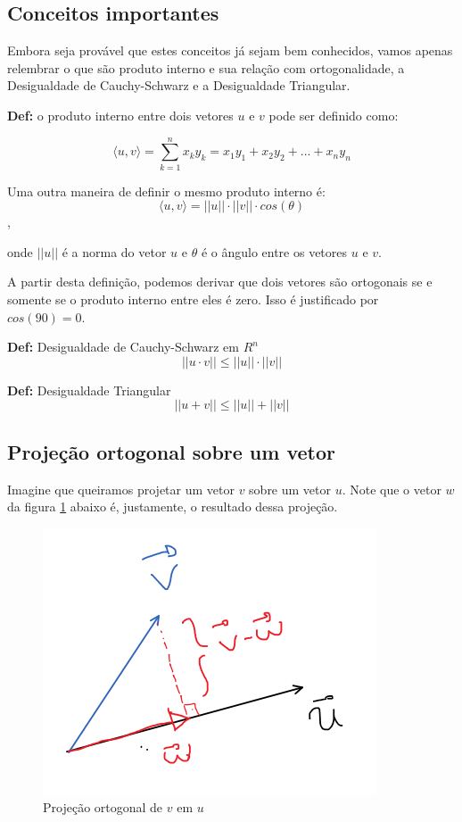 \documentclass[12pt]{article}
\begin{document}
	\subsection{Conceitos importantes}
	
	Embora seja provável que estes conceitos já sejam bem conhecidos, vamos apenas relembrar o que são produto interno e sua relação com ortogonalidade, a Desigualdade de  Cauchy-Schwarz e a Desigualdade Triangular.
	
	\textbf{Def:} o produto interno entre dois vetores $u$ e $v$ pode ser definido como:
	
	\begin{equation*}
		\langle u,v \rangle=\sum_{k=1}^{n}x_k y_k=x_1 y_1+x_2 y_2+...+x_n y_n
	\end{equation*}
	
	Uma outra maneira de definir o mesmo produto interno é:
	\begin{equation*}
		\langle u,v \rangle=||u||\cdot||v||\cdot cos(\theta)
	\end{equation*},
	
	onde $||u||$ é a norma do vetor $u$ e $\theta$ é o ângulo entre os vetores $u$ e $v$.
	
	A partir desta definição, podemos derivar que dois vetores são ortogonais se e somente se o produto interno entre eles é zero. Isso é justificado por $cos(90)=0$.
	
	\textbf{Def:} Desigualdade de Cauchy-Schwarz em $R^n$
	\begin{equation*}
		||u\cdot v|| \leq ||u||\cdot||v||
	\end{equation*}
	
	\textbf{Def:} Desigualdade Triangular
	\begin{equation*}
		||u+ v|| \leq ||u||+||v||
	\end{equation*}
	
	\subsection{Projeção ortogonal sobre um vetor}
	
	Imagine que queiramos projetar um vetor $v$ sobre um vetor $u$. Note que o vetor $w$ da figura \ref{fig:projortog} abaixo é, justamente, o resultado dessa projeção. 
	\begin{figure}[H]
		\centering
		\includegraphics[width=0.4\linewidth]{Imagens/projOrtog}
		\caption{Projeção ortogonal de $v$ em $u$}
		\label{fig:projortog}
	\end{figure}
	
\end{document}
